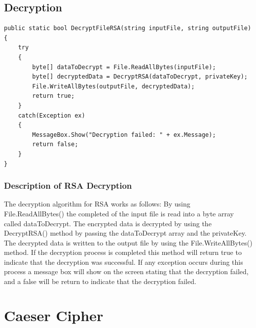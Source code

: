 \documentclass[a4paper,oneside,11pt]{book}
\begin{document}
\section{Decryption}
\begin{lstlisting}[language=Csh, caption={Code for RSA Decryption}]
public static bool DecryptFileRSA(string inputFile, string outputFile)
{
    try
    {
        byte[] dataToDecrypt = File.ReadAllBytes(inputFile);
        byte[] decryptedData = DecryptRSA(dataToDecrypt, privateKey);
        File.WriteAllBytes(outputFile, decryptedData);
        return true;
    }
    catch(Exception ex)
    {
        MessageBox.Show("Decryption failed: " + ex.Message);
        return false;      
    }
}
\end{lstlisting}

\pagestyle{plain}
\subsection{Description of RSA Decryption}

The decryption algorithm for RSA works as follows:
By using File.ReadAllBytes() the completed of the input file is read into a byte array called dataToDecrypt. The encrypted data is decrypted by using the DecryptRSA() method by passing the dataToDecrypt array and the privateKey. The decrypted data is written to the output file by using the File.WriteAllBytes() method. If the decryption process is completed this method will return true to indicate that the decryption was successful. If any exception occurs during this process a message box will show on the screen stating that the decryption failed, and a false will be return to indicate that the decryption failed.

\chapter[Caeser Cipher]{Caeser Cipher}
\end{document}
